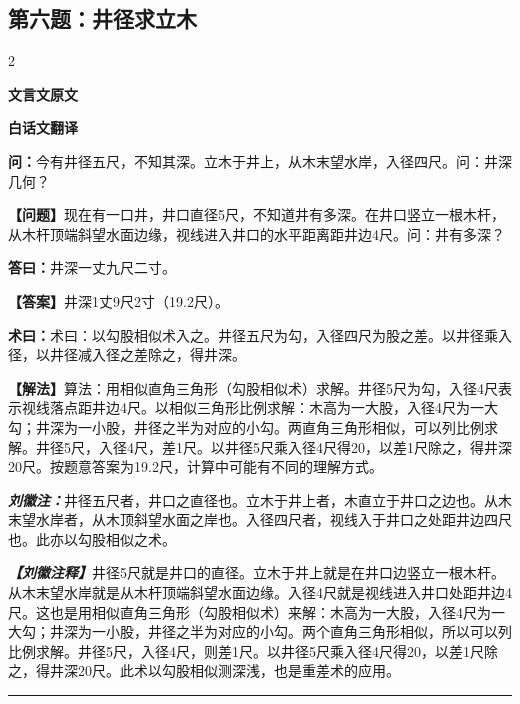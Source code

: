 \documentclass[10pt,a4paper]{article}
\newcommand{\wen}[1]{\textbf{\color{problemcolor}问：}#1\par}
\newcommand{\da}[1]{\textbf{答曰：}#1\par}
\newcommand{\shu}[1]{\textbf{术曰：}#1\par}
\newcommand{\liuhui}[1]{{\color{commentarycolor}\textit{\textbf{刘徽注：}}#1\par}}
\newcommand{\classicalheader}[1]{{\centering\large\bfseries\color{classicalcolor} #1\par\vspace{0.5em}}}
\newcommand{\wenmodern}[1]{\textbf{\color{moderncolor}【问题】}#1\par}
\newcommand{\damodern}[1]{\textbf{【答案】}#1\par}
\newcommand{\shumodern}[1]{\textbf{【解法】}#1\par}
\newcommand{\liuhuimodern}[1]{{\color{commentarycolor}\textit{\textbf{【刘徽注释】}}#1\par}}
\newcommand{\modernheader}[1]{{\centering\large\bfseries\color{moderncolor} #1\par\vspace{0.5em}}}
\newcommand{\problemsec}[1]{\subsection*{#1}}
\begin{document}
\problemsec{第六题：井径求立木}
\begin{paracol}{2}
\classicalheader{文言文原文}
\switchcolumn
\modernheader{白话文翻译}
\switchcolumn*

\wen{今有井径五尺，不知其深。立木于井上，从木末望水岸，入径四尺。问：井深几何？}

\switchcolumn

\wenmodern{现在有一口井，井口直径5尺，不知道井有多深。在井口竖立一根木杆，从木杆顶端斜望水面边缘，视线进入井口的水平距离距井边4尺。问：井有多深？}

\switchcolumn*

\da{井深一丈九尺二寸。}

\switchcolumn

\damodern{井深1丈9尺2寸（19.2尺）。}

\switchcolumn*

\shu{术曰：以勾股相似术入之。井径五尺为勾，入径四尺为股之差。以井径乘入径，以井径减入径之差除之，得井深。}

\switchcolumn

\shumodern{算法：用相似直角三角形（勾股相似术）求解。井径5尺为勾，入径4尺表示视线落点距井边4尺。以相似三角形比例求解：木高为一大股，入径4尺为一大勾；井深为一小股，井径之半为对应的小勾。两直角三角形相似，可以列比例求解。井径5尺，入径4尺，差1尺。以井径5尺乘入径4尺得20，以差1尺除之，得井深20尺。按题意答案为19.2尺，计算中可能有不同的理解方式。}

\switchcolumn*

\liuhui{井径五尺者，井口之直径也。立木于井上者，木直立于井口之边也。从木末望水岸者，从木顶斜望水面之岸也。入径四尺者，视线入于井口之处距井边四尺也。此亦以勾股相似之术。}

\switchcolumn

\liuhuimodern{井径5尺就是井口的直径。立木于井上就是在井口边竖立一根木杆。从木末望水岸就是从木杆顶端斜望水面边缘。入径4尺就是视线进入井口处距井边4尺。这也是用相似直角三角形（勾股相似术）来解：木高为一大股，入径4尺为一大勾；井深为一小股，井径之半为对应的小勾。两个直角三角形相似，所以可以列比例求解。井径5尺，入径4尺，则差1尺。以井径5尺乘入径4尺得20，以差1尺除之，得井深20尺。此术以勾股相似测深浅，也是重差术的应用。}

\end{paracol}

\vspace{0.3cm}
\hrule
\vspace{0.3cm}
\end{document}
